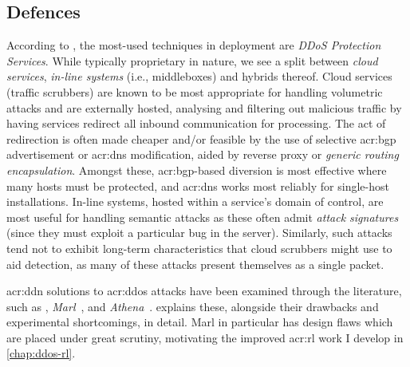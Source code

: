 \subsection{Defences}
According to \textcite{DBLP:conf/imc/JonkerKKRSD17}, the most-used techniques in deployment are \emph{DDoS Protection Services}.
While typically proprietary in nature, we see a split between \emph{cloud services}, \emph{in-line systems} (i.e., middleboxes) and hybrids thereof.
Cloud services (traffic scrubbers) are known to be most appropriate for handling volumetric attacks and are externally hosted, analysing and filtering out malicious traffic by having services redirect all inbound communication for processing.
The act of redirection is often made cheaper and/or feasible by the use of selective \gls{acr:bgp} advertisement or \gls{acr:dns} modification, aided by reverse proxy or \emph{generic routing encapsulation}.
Amongst these, \gls{acr:bgp}-based diversion is most effective where many hosts must be protected, and \gls{acr:dns} works most reliably for single-host installations.
In-line systems, hosted within a service's domain of control, are most useful for handling semantic attacks as these often admit \emph{attack signatures} (since they must exploit a particular bug in the server).
Similarly, such attacks tend not to exhibit long-term characteristics that cloud scrubbers might use to aid detection, as many of these attacks present themselves as a single packet.

\gls{acr:ddn} solutions to \gls{acr:ddos} attacks have been examined through the literature, such as \Textcite{DBLP:conf/lcn/BragaMP10}, \emph{Marl}~\parencite{DBLP:conf/iaai/MalialisK13,DBLP:journals/eaai/MalialisK15}, and \emph{Athena}~\parencite{DBLP:conf/dsn/LeeKSPY17}.
 explains these, alongside their drawbacks and experimental shortcomings, in detail.
Marl in particular has design flaws which are placed under great scrutiny, motivating the improved \gls{acr:rl} work I develop in \cref{chap:ddos-rl}.

